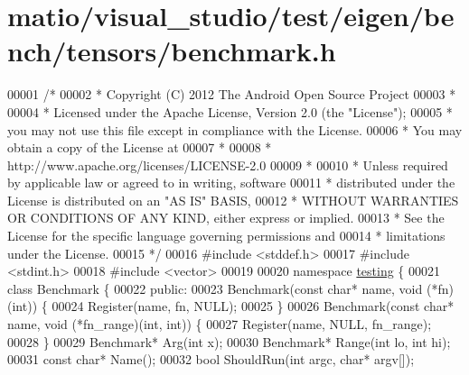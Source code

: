 \hypertarget{matio_2visual__studio_2test_2eigen_2bench_2tensors_2benchmark_8h_source}{}\section{matio/visual\+\_\+studio/test/eigen/bench/tensors/benchmark.h}
\label{matio_2visual__studio_2test_2eigen_2bench_2tensors_2benchmark_8h_source}

\begin{DoxyCode}
00001 \textcolor{comment}{/*}
00002 \textcolor{comment}{ * Copyright (C) 2012 The Android Open Source Project}
00003 \textcolor{comment}{ *}
00004 \textcolor{comment}{ * Licensed under the Apache License, Version 2.0 (the "License");}
00005 \textcolor{comment}{ * you may not use this file except in compliance with the License.}
00006 \textcolor{comment}{ * You may obtain a copy of the License at}
00007 \textcolor{comment}{ *}
00008 \textcolor{comment}{ *      http://www.apache.org/licenses/LICENSE-2.0}
00009 \textcolor{comment}{ *}
00010 \textcolor{comment}{ * Unless required by applicable law or agreed to in writing, software}
00011 \textcolor{comment}{ * distributed under the License is distributed on an "AS IS" BASIS,}
00012 \textcolor{comment}{ * WITHOUT WARRANTIES OR CONDITIONS OF ANY KIND, either express or implied.}
00013 \textcolor{comment}{ * See the License for the specific language governing permissions and}
00014 \textcolor{comment}{ * limitations under the License.}
00015 \textcolor{comment}{ */}
00016 \textcolor{preprocessor}{#include <stddef.h>}
00017 \textcolor{preprocessor}{#include <stdint.h>}
00018 \textcolor{preprocessor}{#include <vector>}
00019 
00020 \textcolor{keyword}{namespace }\hyperlink{namespacetesting}{testing} \{
00021 \textcolor{keyword}{class }Benchmark \{
00022  \textcolor{keyword}{public}:
00023   Benchmark(\textcolor{keyword}{const} \textcolor{keywordtype}{char}* name, \textcolor{keywordtype}{void} (*fn)(\textcolor{keywordtype}{int})) \{
00024     Register(name, fn, NULL);
00025   \}
00026   Benchmark(\textcolor{keyword}{const} \textcolor{keywordtype}{char}* name, \textcolor{keywordtype}{void} (*fn\_range)(\textcolor{keywordtype}{int}, \textcolor{keywordtype}{int})) \{
00027     Register(name, NULL, fn\_range);
00028   \}
00029   Benchmark* Arg(\textcolor{keywordtype}{int} x);
00030   Benchmark* Range(\textcolor{keywordtype}{int} lo, \textcolor{keywordtype}{int} hi);
00031   \textcolor{keyword}{const} \textcolor{keywordtype}{char}* Name();
00032   \textcolor{keywordtype}{bool} ShouldRun(\textcolor{keywordtype}{int} argc, \textcolor{keywordtype}{char}* argv[]);

\end{DoxyCode}
